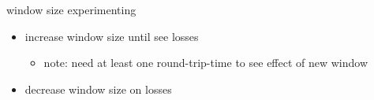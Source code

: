 \begin{frame}{window size experimenting}
\begin{itemize}
\item increase window size until see losses
    \begin{itemize}
    \item note: need at least one round-trip-time to see effect of new window
    \end{itemize}
\item decrease window size on losses
\end{itemize}
\end{frame}
